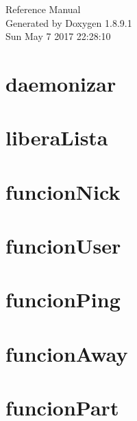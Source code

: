 \documentclass[twoside]{book}
\newcommand{\+}{\discretionary{\mbox{\scriptsize$\hookleftarrow$}}{}{}}
\newcommand{\clearemptydoublepage}{%
  \newpage{\pagestyle{empty}\cleardoublepage}%
}
\begin{document}
\hypersetup{pageanchor=false,
             bookmarks=true,
             bookmarksnumbered=true,
             pdfencoding=unicode
            }
\begin{titlepage}
\vspace*{7cm}
\begin{center}%
{\Large Reference Manual}\\
\vspace*{1cm}
{\large Generated by Doxygen 1.8.9.1}\\
\vspace*{0.5cm}
{\small Sun May 7 2017 22:28:10}\\
\end{center}
\end{titlepage}
\clearemptydoublepage
\tableofcontents
\clearemptydoublepage
{}
\hypersetup{pageanchor=true}

\chapter{daemonizar}
\label{daemonizar}
\hypertarget{daemonizar}{}

\chapter{libera\+Lista}
\label{libera_lista}
\hypertarget{libera_lista}{}

\chapter{funcion\+Nick}
\label{funcion_nick}
\hypertarget{funcion_nick}{}

\chapter{funcion\+User}
\label{funcion_user}
\hypertarget{funcion_user}{}

\chapter{funcion\+Ping}
\label{funcion_ping}
\hypertarget{funcion_ping}{}

\chapter{funcion\+Away}
\label{funcion_away}
\hypertarget{funcion_away}{}

\chapter{funcion\+Part}
\label{funcion_part}
\hypertarget{funcion_part}{}

\end{document}
